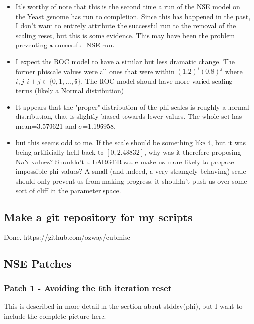 \begin{itemize}
\item It's worthy of note that this is the second time a run of the NSE model on the Yeast genome has run to completion. Since this has happened in the past, I don't want to entirely attribute the successful run to the removal of the scaling reset, but this is some evidence. This may have been the problem preventing a successful NSE run.

\item I expect the ROC model to have a similar but less dramatic change. The former phiscale values were all ones that were within $(1.2)^i(0.8)^j$ where $i, j, i+j \in \{0, 1,...,6\}$. The ROC model should have more varied scaling terms (likely a Normal distribution)

\item It appears that the "proper" distribution of the phi scales is roughly a normal distribution, that is slightly biased towards lower values. The whole set has mean=3.570621 and $\sigma$=1.196958.


\item but this seems odd to me. If the scale should be something like 4, but it was being artificially held back to $[0,2.48832]$, why was it therefore proposing NaN values? Shouldn't a LARGER scale make us more likely to propose impossible phi values? A small (and indeed, a very strangely behaving) scale should only prevent us from making progress, it shouldn't push us over some sort of cliff in the parameter space.
\end{itemize}

\subsection{Make a git repository for my scripts}

Done. https://github.com/ozway/cubmisc

\subsection{NSE Patches}

\subsubsection{Patch 1 - Avoiding the 6th iteration reset}

This is described in more detail in the section about stddev(phi), but I want to include the complete picture here.

